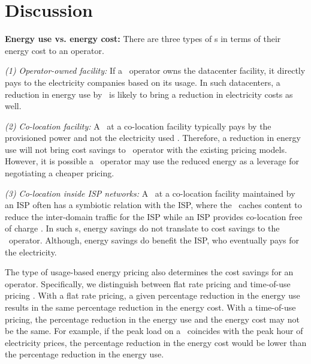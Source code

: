 
\section{Discussion}
\label{sec:discussion}

\textbf{Energy use vs. energy cost:} There are three types of \cdc s in terms of their energy cost to an operator. 

\emph{(1) Operator-owned facility:} If a \cdc\ operator owns the datacenter facility, it directly pays to the electricity companies based on its usage. In such datacenters, a reduction in energy use by \shrink\ is likely to bring a reduction in electricity costs as well.

\emph{(2) Co-location facility:} A \cdc\ at a co-location facility typically pays by the provisioned power and not the electricity used \cite{qureshi2009cutting}. Therefore, a reduction in energy use will not bring cost savings to \cdc\ operator with the existing pricing models. However, it is possible a \cdc\ operator may use the reduced energy as a leverage for negotiating a cheaper pricing. 

\emph{(3) Co-location inside ISP networks:} A \cdc\ at a co-location facility maintained by an ISP often has a symbiotic relation with the ISP, where the \cdc\ caches content to reduce the inter-domain traffic for the ISP while an ISP provides co-location free of charge \cite{google-caching}. In such \cdc s, energy savings do not translate to cost savings to the \cdc\ operator.  Although, energy savings do benefit the ISP, who eventually pays for the electricity.

The type of usage-based energy pricing also determines the cost savings for an operator. Specifically, we distinguish between flat rate pricing and time-of-use pricing \cite{pge-website}. With a flat rate pricing, a given percentage reduction in the energy use results in the same percentage reduction in the energy cost. With a time-of-use pricing, the percentage reduction in the energy use and the energy cost may not be the same. For example, if the peak load on a \cdc\ coincides with the peak hour of electricity prices, the percentage reduction in the energy cost would be lower than the percentage reduction in the energy use.


